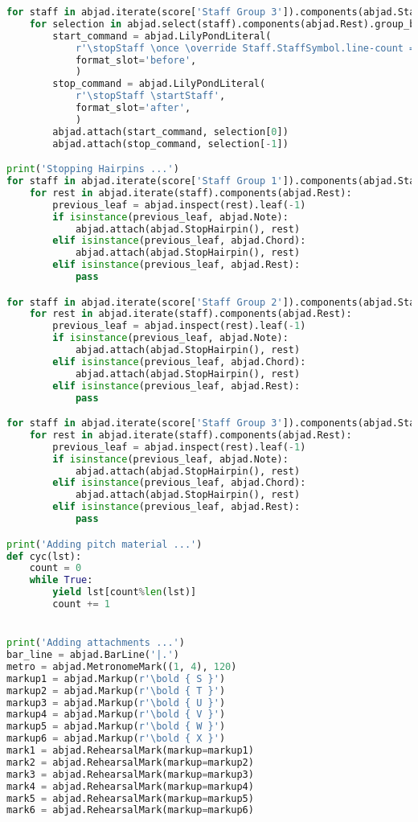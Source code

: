 \begin{lstlisting}[language=Python, caption=Tianshu Segment\_IV]
for staff in abjad.iterate(score['Staff Group 3']).components(abjad.Staff):
    for selection in abjad.select(staff).components(abjad.Rest).group_by_contiguity():
        start_command = abjad.LilyPondLiteral(
            r'\stopStaff \once \override Staff.StaffSymbol.line-count = #1 \startStaff',
            format_slot='before',
            )
        stop_command = abjad.LilyPondLiteral(
            r'\stopStaff \startStaff',
            format_slot='after',
            )
        abjad.attach(start_command, selection[0])
        abjad.attach(stop_command, selection[-1])

print('Stopping Hairpins ...')
for staff in abjad.iterate(score['Staff Group 1']).components(abjad.Staff):
    for rest in abjad.iterate(staff).components(abjad.Rest):
        previous_leaf = abjad.inspect(rest).leaf(-1)
        if isinstance(previous_leaf, abjad.Note):
            abjad.attach(abjad.StopHairpin(), rest)
        elif isinstance(previous_leaf, abjad.Chord):
            abjad.attach(abjad.StopHairpin(), rest)
        elif isinstance(previous_leaf, abjad.Rest):
            pass

for staff in abjad.iterate(score['Staff Group 2']).components(abjad.Staff):
    for rest in abjad.iterate(staff).components(abjad.Rest):
        previous_leaf = abjad.inspect(rest).leaf(-1)
        if isinstance(previous_leaf, abjad.Note):
            abjad.attach(abjad.StopHairpin(), rest)
        elif isinstance(previous_leaf, abjad.Chord):
            abjad.attach(abjad.StopHairpin(), rest)
        elif isinstance(previous_leaf, abjad.Rest):
            pass

for staff in abjad.iterate(score['Staff Group 3']).components(abjad.Staff):
    for rest in abjad.iterate(staff).components(abjad.Rest):
        previous_leaf = abjad.inspect(rest).leaf(-1)
        if isinstance(previous_leaf, abjad.Note):
            abjad.attach(abjad.StopHairpin(), rest)
        elif isinstance(previous_leaf, abjad.Chord):
            abjad.attach(abjad.StopHairpin(), rest)
        elif isinstance(previous_leaf, abjad.Rest):
            pass

print('Adding pitch material ...')
def cyc(lst):
    count = 0
    while True:
        yield lst[count%len(lst)]
        count += 1


print('Adding attachments ...')
bar_line = abjad.BarLine('|.')
metro = abjad.MetronomeMark((1, 4), 120)
markup1 = abjad.Markup(r'\bold { S }')
markup2 = abjad.Markup(r'\bold { T }')
markup3 = abjad.Markup(r'\bold { U }')
markup4 = abjad.Markup(r'\bold { V }')
markup5 = abjad.Markup(r'\bold { W }')
markup6 = abjad.Markup(r'\bold { X }')
mark1 = abjad.RehearsalMark(markup=markup1)
mark2 = abjad.RehearsalMark(markup=markup2)
mark3 = abjad.RehearsalMark(markup=markup3)
mark4 = abjad.RehearsalMark(markup=markup4)
mark5 = abjad.RehearsalMark(markup=markup5)
mark6 = abjad.RehearsalMark(markup=markup6)


\end{lstlisting}
